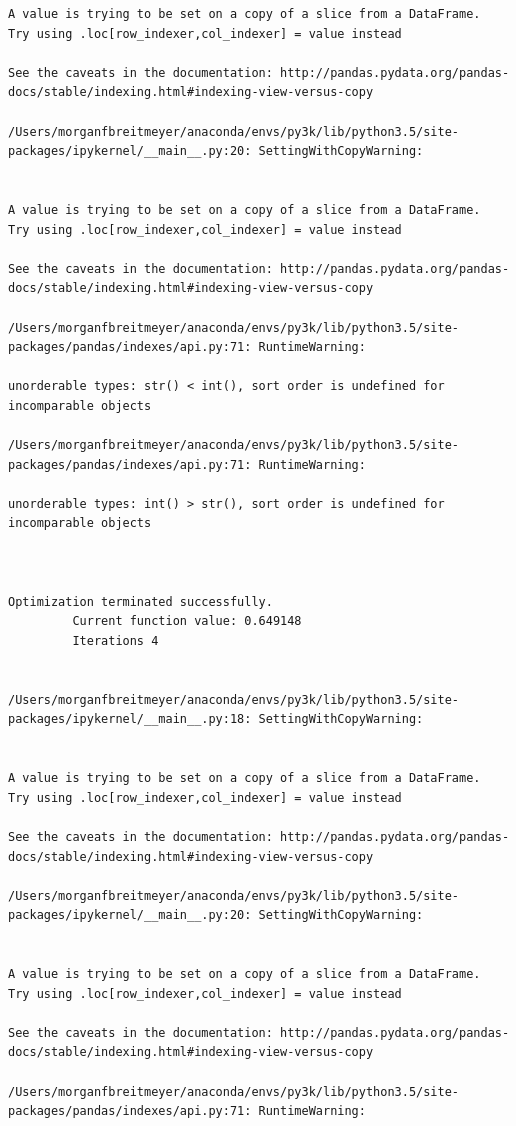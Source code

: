\begin{lstlisting}
A value is trying to be set on a copy of a slice from a DataFrame.
Try using .loc[row_indexer,col_indexer] = value instead

See the caveats in the documentation: http://pandas.pydata.org/pandas-docs/stable/indexing.html#indexing-view-versus-copy

/Users/morganfbreitmeyer/anaconda/envs/py3k/lib/python3.5/site-packages/ipykernel/__main__.py:20: SettingWithCopyWarning:


A value is trying to be set on a copy of a slice from a DataFrame.
Try using .loc[row_indexer,col_indexer] = value instead

See the caveats in the documentation: http://pandas.pydata.org/pandas-docs/stable/indexing.html#indexing-view-versus-copy

/Users/morganfbreitmeyer/anaconda/envs/py3k/lib/python3.5/site-packages/pandas/indexes/api.py:71: RuntimeWarning:

unorderable types: str() < int(), sort order is undefined for incomparable objects

/Users/morganfbreitmeyer/anaconda/envs/py3k/lib/python3.5/site-packages/pandas/indexes/api.py:71: RuntimeWarning:

unorderable types: int() > str(), sort order is undefined for incomparable objects



Optimization terminated successfully.
         Current function value: 0.649148
         Iterations 4


/Users/morganfbreitmeyer/anaconda/envs/py3k/lib/python3.5/site-packages/ipykernel/__main__.py:18: SettingWithCopyWarning:


A value is trying to be set on a copy of a slice from a DataFrame.
Try using .loc[row_indexer,col_indexer] = value instead

See the caveats in the documentation: http://pandas.pydata.org/pandas-docs/stable/indexing.html#indexing-view-versus-copy

/Users/morganfbreitmeyer/anaconda/envs/py3k/lib/python3.5/site-packages/ipykernel/__main__.py:20: SettingWithCopyWarning:


A value is trying to be set on a copy of a slice from a DataFrame.
Try using .loc[row_indexer,col_indexer] = value instead

See the caveats in the documentation: http://pandas.pydata.org/pandas-docs/stable/indexing.html#indexing-view-versus-copy

/Users/morganfbreitmeyer/anaconda/envs/py3k/lib/python3.5/site-packages/pandas/indexes/api.py:71: RuntimeWarning:


\end{lstlisting}
